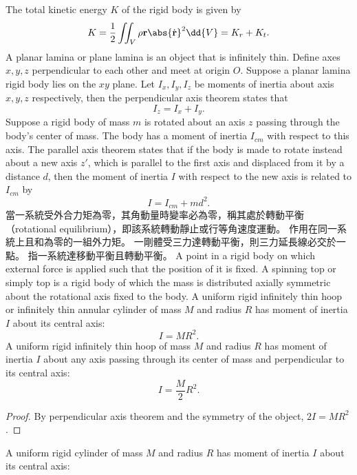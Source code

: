 \documentclass[a4paper,12pt]{article}
\begin{document}
The total kinetic energy $K$ of the rigid body is given by
\[K=\frac{1}{2}\iint_V\rho{\mathbf{r}}\abs{\dot{\mathbf{r}}}^2\dd{V}=K_r+K_t.\]
A planar lamina or plane lamina is an object that is infinitely thin.
Define axes $x,y,z$ perpendicular to each other and meet at origin $O$. Suppose a planar lamina rigid body lies on the $xy$ plane. Let $I_x,I_y,I_z$ be moments of inertia about axis $x,y,z$ respectively, then the perpendicular axis theorem states that
\[I_z=I_x+I_y.\]
Suppose a rigid body of mass $m$ is rotated about an axis $z$ passing through the body's center of mass. The body has a moment of inertia $I_{cm}$ with respect to this axis. The parallel axis theorem states that if the body is made to rotate instead about a new axis $z'$, which is parallel to the first axis and displaced from it by a distance $d$, then the moment of inertia $I$ with respect to the new axis is related to $I_{cm}$ by
\[I=I_{cm}+md^2.\]
當一系統受外合力矩為零，其角動量時變率必為零，稱其處於轉動平衡（rotational equilibrium），即該系統轉動靜止或行等角速度運動。
作用在同一系統上且和為零的一組外力矩。
一剛體受三力達轉動平衡，則三力延長線必交於一點。
指一系統達移動平衡且轉動平衡。
A point in a rigid body on which external force is applied such that the position of it is fixed.
A spinning top or simply top is a rigid body of which the mass is distributed axially symmetric about the rotational axis fixed to the body.
A uniform rigid infinitely thin hoop or infinitely thin annular cylinder of mass $M$ and radius $R$ has moment of inertia $I$ about its central axis:
\[I=MR^2.\]
A uniform rigid infinitely thin hoop of mass $M$ and radius $R$ has moment of inertia $I$ about any axis passing through its center of mass and perpendicular to its central axis:
\[I=\frac{M}{2}R^2.\]
\begin{proof}
By perpendicular axis theorem and the symmetry of the object, $2I=MR^2$.
\end{proof}
A uniform rigid cylinder of mass $M$ and radius $R$ has moment of inertia $I$ about its central axis:
\end{document}
